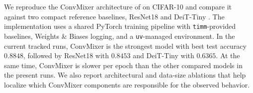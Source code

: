 We reproduce the ConvMixer architecture of \citet{trockman2022patches} on CIFAR-10 and compare it against two compact reference baselines, ResNet18 \citep{he2016deep} and DeiT-Tiny \citep{touvron2021training}. The implementation uses a shared PyTorch training pipeline with \texttt{timm}-provided baselines, Weights \& Biases logging, and a \texttt{uv}-managed environment. In the current tracked runs, ConvMixer is the strongest model with best test accuracy $0.8848$, followed by ResNet18 with $0.8453$ and DeiT-Tiny with $0.6365$. At the same time, ConvMixer is slower per epoch than the other compared models in the present runs. We also report architectural and data-size ablations that help localize which ConvMixer components are responsible for the observed behavior.
